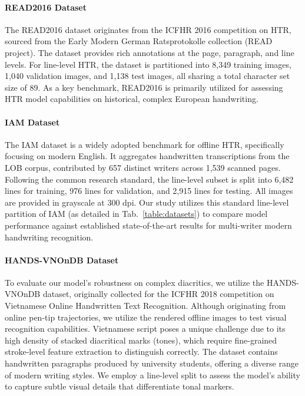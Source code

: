 \documentclass[final,5p,times]{elsarticle}
\begin{document}
\paragraph{READ2016 Dataset}
The READ2016 dataset originates from the ICFHR 2016 competition on HTR, sourced from the Early Modern German Ratsprotokolle collection (READ project). The dataset provides rich annotations at the page, paragraph, and line levels. For line-level HTR, the dataset is partitioned into 8,349 training images, 1,040 validation images, and 1,138 test images, all sharing a total character set size of 89. As a key benchmark, READ2016 is primarily utilized for assessing HTR model capabilities on historical, complex European handwriting.

\paragraph{IAM Dataset}
The IAM dataset is a widely adopted benchmark for offline HTR, specifically focusing on modern English.
It aggregates handwritten transcriptions from the LOB corpus, contributed by 657 distinct writers across 1,539 scanned pages.
Following the common research standard, the line-level subset is split into 6,482 lines for training, 976 lines for validation, and 2,915 lines for testing. All images are provided in grayscale at 300 dpi. Our study utilizes this standard line-level partition of IAM (as detailed in Tab.~\ref{table:datasets}) to compare model performance against established state-of-the-art results for multi-writer modern handwriting recognition.

\paragraph{HANDS-VNOnDB Dataset}
To evaluate our model's robustness on complex diacritics, we utilize the HANDS-VNOnDB dataset, originally collected for the ICFHR 2018 competition on Vietnamese Online Handwritten Text Recognition. Although originating from online pen-tip trajectories, we utilize the rendered offline images to test visual recognition capabilities. Vietnamese script poses a unique challenge due to its high density of stacked diacritical marks (tones), which require fine-grained stroke-level feature extraction to distinguish correctly. The dataset contains handwritten paragraphs produced by university students, offering a diverse range of modern writing styles. We employ a line-level split to assess the model's ability to capture subtle visual details that differentiate tonal markers.
\end{document}
